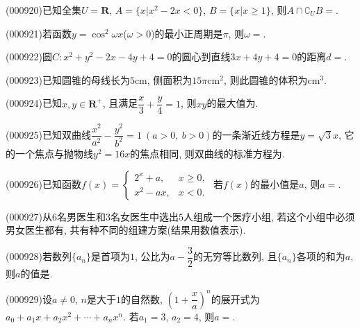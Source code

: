 \begin{center}
\end{center}
\item (000920)已知全集$U=\mathbf{R}$, $A=\{x|x^2-2x<0\}$, $B=\{x|x\ge 1\}$, 则$A\cap \complement_U B=$.
\item (000921)若函数$y=\cos ^2 \omega x$($\omega >0$)的最小正周期是$\pi$, 则$\omega=$.
\item (000922)圆$C:x^2+y^2-2x-4y+4=0$的圆心到直线$3x+4y+4=0$的距离$d=$.
\item (000923)已知圆锥的母线长为$5\text{cm}$, 侧面积为$15 \pi \text{cm}^2$, 则此圆锥的体积为$\text{cm}^3$.
\item (000924)已知$x,y\in \mathbf{R}^+$, 且满足$\dfrac x3+\dfrac y4=1$, 则$xy$的最大值为.
\item (000925)已知双曲线$\dfrac{x^2}{a^2}-\dfrac{y^2}{b^2}=1 \ (a>0,\ b>0)$的一条渐近线方程是$y=\sqrt3x$, 它的一个焦点与抛物线$y^2=16x$的焦点相同, 则双曲线的标准方程为.
\item (000926)已知函数$f(x)=\begin{cases}2^x +a, & x\ge 0, \\ x^2-ax, & x<0.\end{cases}$ 若$f(x)$的最小值是$a$, 则$a=$.
\item (000927)从$6$名男医生和$3$名女医生中选出$5$人组成一个医疗小组, 若这个小组中必须男女医生都有, 共有种不同的组建方案(结果用数值表示).
\item (000928)若数列$\{a_n\}$是首项为$1$, 公比为$a-\dfrac32$的无穷等比数列, 且$\{a_n\}$各项的和为$a$, 则$a$的值是.
\item (000929)设$a\ne 0$, $n$是大于$1$的自然数, $(1+\dfrac xa)^n$的展开式为$a_0+a_1x+a_2x^2+\cdots+a_nx^n$. 若$a_1=3$, $a_2=4$, 则$a=$.
